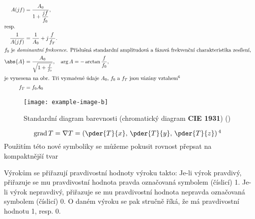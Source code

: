 \documentclass{scrbook}
\begin{document}
\begin{subequations}\label{aes:eq036}
  \begin{align}
    A(jf)   &= \dfrac{A_0}{1 + \dfrac{jf}{f_0}},                  \label{aes:eq036a}  \\
    \shortintertext{resp.}   
    \dfrac{1}{A(jf)} &=  \dfrac{1}{A_0} + j\dfrac{f}{f_T}.        \label{aes:eq036b}  \\
    \shortintertext{\(f_0\) je \emph{dominantní frekvence}. Příslušná standardní amplitudová 
                    a fázová frekvenční charakteristika zesílení,}
    \abs{A} &= \dfrac{A_0}{\sqrt{1 + \frac{f}{f_0}}}, \quad 
              \arg{A} = - \arctan\dfrac{f}{f_0},                  \label{aes:eq036c}  \\ 
    \shortintertext{je vynesena na obr. Tři vyznačené údaje \(A_0\), 
                    \(f_0\) a \(f_T\) jsou vázány vztahem\protect\footnotemark[6]}
    f_T &= f_0A_0                                                 \label{aes:eq036d}
  \end{align}
\end{subequations}

\begin{figure}[ht!]  %
  \centering
  \texttt{[image: example-image-b]}
  \caption{Standardní diagram barevnosti (chromatický diagram \textbf{CIE
   1931}\protect\footnotemark[5]) (\cite[s.~468]{Feynman01})}
  \label{fyz:fig133}
\end{figure}


\begin{equation}\label{fyz:eq252}
  \mathrm{grad}\,T =\nabla T = \left(\pder{T}{x},\, \pder{T}{y},\,\pder{T}{z} \right)
  \protect\footnotemark[4]
\end{equation}
Použitím této nové symboliky se můžeme pokusit rovnost 
přepsat na kompaktnější tvar

\begin{mdframed}[style=mdnote]
  \begin{note}
    Výrokům se přiřazují pravdivostní hodnoty výroku takto: Je-li výrok pravdivý, přiřazuje se
    mu pravdivostní hodnota pravda označovaná symbolem (číslicí)
    \num{1}\protect\footnotemark[2]. Je-li výrok nepravdivý, přiřazuje se mu pravdivostní
    hodnota nepravda označovaná symbolem (číslicí) \num{0}. O daném výroku se pak stručně
    říká, že má pravdivostní hodnotu \num{1}\protect\footnotemark[1], resp. \num{0}. 
  \end{note}
\end{mdframed}
\end{document}
